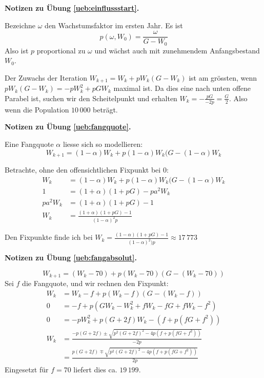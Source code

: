 \documentclass[%
11pt,%
twoside,%
titlepage,%
german,%
headsepline%
]{scrartcl}
\newcommand{\concatueb}[1]{ueb:#1}%
\newcommand{\concatlsg}[1]{lsg:#1}%
\newenvironment{lsg}[1]{%
    \par\noindent\textbf{Notizen zu Übung \ref{\concatueb{#1}}.}%
    \label{\concatlsg{#1}}
}{%
    \par%
}
\begin{document}
\begin{lsg}{einflussstart}
    Bezeichne $\omega$ den Wachstumsfaktor im ersten Jahr. Es ist
    $$p(\omega,W_0)=\frac{\omega}{G-W_0}$$
    Also ist $p$ proportional zu $\omega$ und wächst auch mit zunehmendem Anfangsbestand $W_0$.

    Der Zuwachs der Iteration $W_{k+1} = W_k+pW_k(G-W_k)$ ist am grössten, wenn $pW_k(G-W_k)=-pW_k^2+pGW_k$ maximal ist. Da dies eine nach unten offene Parabel ist, suchen wir den Scheitelpunkt und erhalten $W_k=-\frac{pG}{-2p}=\frac{G}{2}$. Also wenn die Population $10\,000$ beträgt.
\end{lsg}
\begin{lsg}{fangquote}
    Eine Fangquote $\alpha$ liesse sich so modellieren:
    $$W_{k+1}=(1-\alpha)W_k+p(1-\alpha)W_k(G-(1-\alpha)W_k$$

    Betrachte, ohne den offensichtlichen Fixpunkt bei $0$:
    \begin{align*}
        W_{k} &= (1-\alpha)W_k+p(1-\alpha)W_k(G-(1-\alpha)W_k\\
        1 &= (1+\alpha)(1+pG)-pa^2W_k\\
        pa^2W_k &= (1+\alpha)(1+pG)-1\\
        W_k &= \frac{(1+\alpha)(1+pG)-1}{(1-\alpha)^2p}
    \end{align*}
    
    Den Fixpunkte finde ich bei $W_k=\frac{(1-\alpha)(1+pG)-1}{(1-\alpha)^2)p}\approx17\,773$
\end{lsg}
\begin{lsg}{fangabsolut}
    $$W_{k+1}=(W_k-70)+p(W_k-70)(G-(W_k-70))$$
 Sei $f$ die Fangquote, und wir rechnen den Fixpunkt:
    \begin{align*}
        W_{k} &= W_k-f+p(W_k-f)(G-(W_k-f))\\
        0 &= -f+p(GW_k-W_k^2+fW_k-fG+fW_k-f^2)\\
        0 &= -pW_k^2+p(G+2f)W_k-(f+p(fG+f^2))\\
        W_k &= \frac{-p(G+2f)\pm\sqrt{p^2(G+2f)^2-4p(f+p(fG+f^2))}}{-2p}\\
        &= \frac{p(G+2f)\mp\sqrt{p^2(G+2f)^2-4p(f+p(fG+f^2))}}{2p}
    \end{align*}
    Eingesetzt für $f=70$ liefert dies ca. $19\,199$.
\end{lsg}

\clearpage
\end{document}

